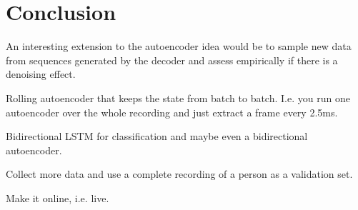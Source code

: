 \chapter{Conclusion}
\label{cha:conclusion}

An interesting extension to the autoencoder idea would be to sample new data
from sequences generated by the decoder and assess empirically if there is a
denoising effect.

Rolling autoencoder that keeps the state from batch to batch. I.e. you run one
autoencoder over the whole recording and just extract a frame every 2.5ms.

Bidirectional LSTM for classification and maybe even a bidirectional
autoencoder.

Collect more data and use a complete recording of a person as a validation set.

Make it online, i.e. live.
